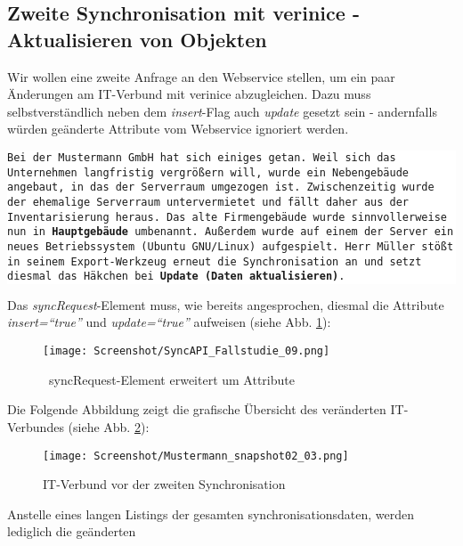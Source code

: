 \documentclass[a4paper,10pt]{book}
\begin{document}
\subsection{ Zweite Synchronisation mit verinice - Aktualisieren von Objekten}
Wir wollen eine zweite Anfrage an den Webservice stellen, um ein paar Änderungen am IT-Verbund mit verinice abzugleichen. Dazu
muss selbstverständlich neben dem \textit{insert}-Flag auch \textit{update} gesetzt sein - andernfalls würden geänderte Attribute
vom Webservice ignoriert werden.
\newline
\newline
\colorbox{white}{\parbox{\textwidth}{
{\tt Bei der Mustermann GmbH hat sich einiges getan. Weil sich das Unternehmen langfristig vergrößern will, wurde ein Nebengebäude angebaut,
in das der Serverraum umgezogen ist. Zwischenzeitig wurde der ehemalige Serverraum untervermietet und fällt daher aus der Inventarisierung heraus.
Das alte Firmengebäude wurde sinnvollerweise nun in \textbf{Hauptgebäude} umbenannt. Außerdem wurde auf einem der Server ein neues Betriebssystem
(Ubuntu GNU/Linux) aufgespielt. Herr Müller stößt in seinem Export-Werkzeug erneut die Synchronisation an und setzt diesmal das Häkchen bei
\textbf{Update (Daten aktualisieren)}.}
}}\newline\newline
Das \textit{syncRequest}-Element muss, wie bereits angesprochen, diesmal die Attribute \textit{insert=``true''} und
\textit{update=``true''} aufweisen (siehe Abb. \ref{syncRequest-Element erweitert um Attribute}):
\newline
\begin{figure}[htb!]
  \centering
  \texttt{[image: Screenshot/SyncAPI\_Fallstudie\_09.png]}
  \caption{\label{syncRequest-Element erweitert um Attribute} \ syncRequest-Element erweitert um Attribute}
\end{figure}
\newline
Die Folgende Abbildung zeigt die grafische Übersicht des veränderten
IT-Verbundes (siehe
Abb. \ref{fig:it-verbund-vor-der-zweiten-synchronisation}):
\newline
\begin{figure}[htb!]
  \centering
  \texttt{[image: Screenshot/Mustermann\_snapshot02\_03.png]}
  \caption{IT-Verbund vor der zweiten Synchronisation}
  \label{fig:it-verbund-vor-der-zweiten-synchronisation}
\end{figure}
\newline
Anstelle eines langen Listings der gesamten synchronisationsdaten, werden lediglich die geänderten
\end{document}
